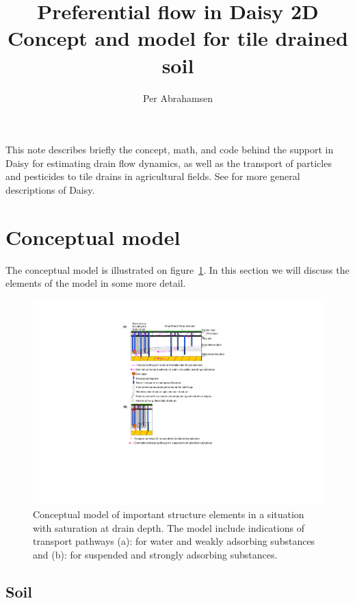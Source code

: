 \documentclass[a4paper]{article}
\begin{document}
\title{Preferential flow in Daisy 2D\\
  Concept and model for tile drained soil} 
\author{Per Abrahamsen}

\maketitle

This note describes briefly the concept, math, and code behind the
support in Daisy for estimating drain flow dynamics, as well as the
transport of particles and pesticides to tile drains in agricultural
fields.  See \citet{daisy-def,daisy-ems,daisy-new,daisyN} for more
general descriptions of Daisy.

\section{Conceptual model}

The conceptual model is illustrated on figure~\ref{fig:concept}.  In
this section we will discuss the elements of the model in some more
detail.

\begin{figure}[htbp]
  \includegraphics[trim=9cm 6cm 10cm 2cm,clip=true,width=\textwidth]{r2d2-concept}
  \caption{Conceptual model of important structure elements in a
    situation with saturation at drain depth. The model include
    indications of transport pathways (a): for water and weakly
    adsorbing substances and (b): for suspended and strongly adsorbing
    substances.}
  \label{fig:concept}
\end{figure}

\subsection{Soil}
\end{document}
